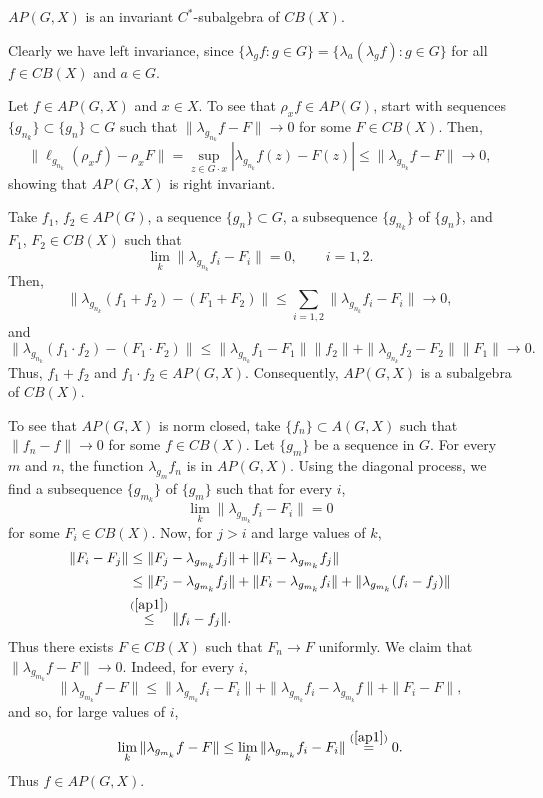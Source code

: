 \begin{lemma}\label{sk4.2.2}
$AP(G,X)$ is an invariant $C^*$-subalgebra of $CB(X)$.
\end{lemma}
\proof
Clearly we have left invariance, since $\{\lambda_g f : g\in G \} =
\{\lambda_a (\lambda_g f) : g\in G \}$ for all $f\in CB(X)$ and $a\in G$.

Let $f\in AP(G,X)$ and $x\in X$.  To see that $\rho_x f \in AP(G)$, start with sequences
$\{g_{n_k}\} \subset \{g_n\} \subset G$ such that
$\|\lambda_{g_{n_k}}f - F\| \rightarrow 0$ for some $F\in CB(X)$.  Then,
\[
\|\ell_{g_{n_k}} (\rho_x f) - \rho_x F\| = \sup_{z\in G\cdot x} |\lambda_{g_{n_k}} f(z) - F(z)|
\leq \|\lambda_{g_{n_k}}f - F\| \rightarrow 0,
\]
showing that $AP(G,X)$ is right invariant.

Take $f_1$, $f_2 \in AP(G)$, a sequence $\{g_n\} \subset G$, a subsequence $\{g_{n_k}\}$ of $\{g_n\}$,
and $F_1$, $F_2 \in CB(X)$ such that
\[
\lim_k \|\lambda_{g_{n_k}}f_i - F_i\| = 0,\qquad i=1,2.
\]
Then,
\[
\|\lambda_{g_{n_k}}(f_1 + f_2) - (F_1 + F_2)\| \leq \sum_{i=1,2}\|\lambda_{g_{n_k}}f_i - F_i\| \rightarrow 0,
\]
and
\[
\|\lambda_{g_{n_k}}(f_1\cdot f_2) - (F_1\cdot F_2)\|
\leq \|\lambda_{g_{n_k}}f_1 - F_1\|\|f_2\| + \|\lambda_{g_{n_k}}f_2 - F_2\|\|F_1\| \rightarrow 0.
\]
Thus, $f_1 + f_2$ and $f_1\cdot f_2 \in AP(G,X)$.  Consequently, $AP(G,X)$ is a subalgebra of $CB(X)$.

To see that $AP(G,X)$ is norm closed, take $\{f_n\} \subset A(G,X)$ such that $\|f_n - f\| \rightarrow 0$ for
some $f\in CB(X)$.  Let $\{g_m\}$ be a sequence in $G$.  For every $m$ and $n$, the function
$\lambda_{g_m}f_n$ is in $AP(G,X)$.
Using the diagonal process, we find a subsequence $\{g_{m_k}\}$ of $\{g_m\}$ such that
for every $i$,
\begin{equation}\label{ap1}
\lim_k \|\lambda_{g_{m_k}}f_i - F_i\| = 0
\end{equation}
for some $F_i \in CB(X)$.
Now, for $j > i$ and large values of $k$,
\begin{align*}
\|F_i - F_j\| &\leq \|F_j - \lambda_{g_{m_k}}f_j\| + \|F_i - \lambda_{g_{m_k}}f_j\| \\
&\leq \|F_j - \lambda_{g_{m_k}}f_j\| + \|F_i - \lambda_{g_{m_k}}f_i\| + \|\lambda_{g_{m_k}}(f_i - f_j)\| \\
&\!\stackrel{(\ref{ap1})}{\leq}\|f_i - f_j\|.
\end{align*}
Thus there exists $F\in CB(X)$ such that $F_n \rightarrow F$ uniformly.  We claim that
$\|\lambda_{g_{m_k}}f - F\| \rightarrow 0$.  Indeed, for every $i$,
\[
\|\lambda_{g_{m_k}}f - F \| \leq \|\lambda_{g_{m_k}}f_i - F_i\| + \|\lambda_{g_{m_k}}f_i - \lambda_{g_{m_k}}f\|
+ \|F_i - F \|,
\]
and so, for large values of $i$,
\[
\lim_k \|\lambda_{g_{m_k}}f - F\| \leq \lim_k \|\lambda_{g_{m_k}}f_i - F_i\| \stackrel{(\ref{ap1})}{=} 0.
\]
Thus $f\in AP(G,X)$.
\done

